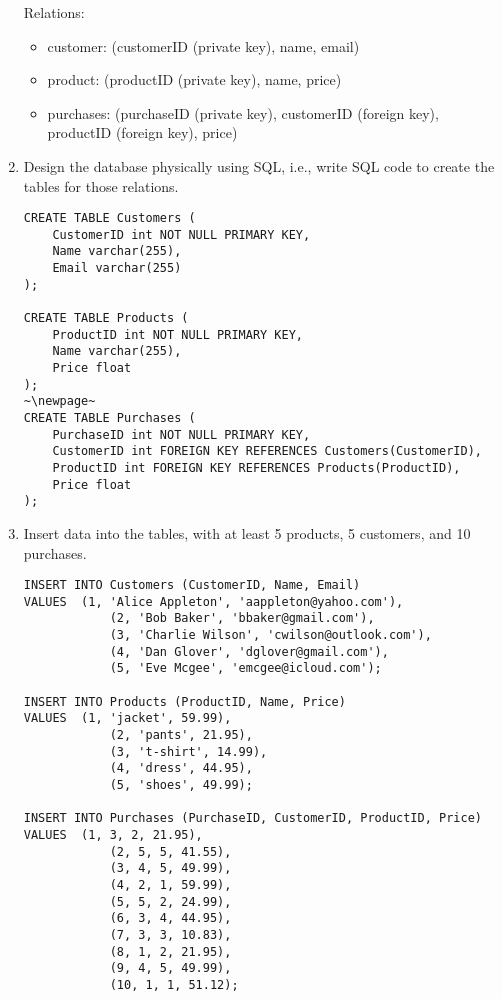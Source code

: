 \documentclass[notitlepage, 11pt]{report}
\begin{document}
\begin{enumerate}[itemindent=-1.5em]
	Relations:
	\begin{itemize}
		\item customer: (customerID (private key), name, email)
		\item product: (productID (private key), name, price)
		\item purchases: (purchaseID (private key), customerID (foreign key), productID (foreign key), price)
	\end{itemize}
	\item Design the database physically using SQL, i.e., write SQL code to create the tables for those relations.
\Suppressnumber
\begin{lstlisting}
CREATE TABLE Customers (
	CustomerID int NOT NULL PRIMARY KEY,
	Name varchar(255),
	Email varchar(255)
);

CREATE TABLE Products (
	ProductID int NOT NULL PRIMARY KEY,
	Name varchar(255),
	Price float
);
~\newpage~
CREATE TABLE Purchases (
	PurchaseID int NOT NULL PRIMARY KEY,
	CustomerID int FOREIGN KEY REFERENCES Customers(CustomerID),
	ProductID int FOREIGN KEY REFERENCES Products(ProductID),
	Price float
);
\end{lstlisting}
	\item Insert data into the tables, with at least 5 products, 5 customers, and 10 purchases.
\begin{lstlisting}
INSERT INTO Customers (CustomerID, Name, Email)
VALUES	(1, 'Alice Appleton', 'aappleton@yahoo.com'),
			(2, 'Bob Baker', 'bbaker@gmail.com'),
			(3, 'Charlie Wilson', 'cwilson@outlook.com'),
			(4, 'Dan Glover', 'dglover@gmail.com'),
			(5, 'Eve Mcgee', 'emcgee@icloud.com');

INSERT INTO Products (ProductID, Name, Price)
VALUES	(1, 'jacket', 59.99),
			(2, 'pants', 21.95),
			(3, 't-shirt', 14.99),
			(4, 'dress', 44.95),
			(5, 'shoes', 49.99);

INSERT INTO Purchases (PurchaseID, CustomerID, ProductID, Price)
VALUES	(1, 3, 2, 21.95),
			(2, 5, 5, 41.55),
			(3, 4, 5, 49.99),
			(4, 2, 1, 59.99),
			(5, 5, 2, 24.99),
			(6, 3, 4, 44.95),
			(7, 3, 3, 10.83),
			(8, 1, 2, 21.95),
			(9, 4, 5, 49.99),
			(10, 1, 1, 51.12);
\end{lstlisting}
\end{enumerate}
\end{document}
